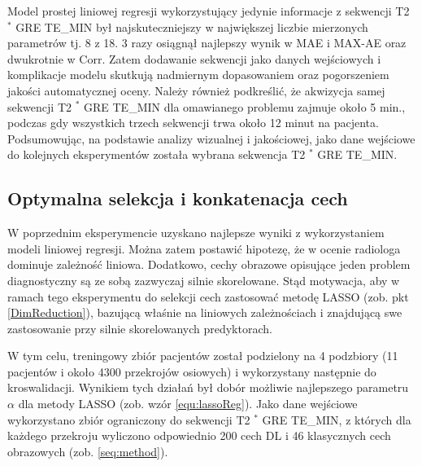 Model prostej liniowej regresji wykorzystujący jedynie informacje z sekwencji T2 $^\ast$ GRE TE\_MIN był najskuteczniejszy w największej liczbie mierzonych parametrów tj. 8 z 18. 3 razy osiągnął najlepszy wynik w MAE i MAX-AE oraz dwukrotnie w Corr. Zatem dodawanie sekwencji jako danych wejściowych i komplikacje modelu skutkują nadmiernym dopasowaniem oraz pogorszeniem jakości automatycznej oceny. Należy również podkreślić, że akwizycja samej sekwencji T2 $^\ast$ GRE TE\_MIN dla omawianego problemu zajmuje około 5 min., podczas gdy wszystkich trzech sekwencji trwa około 12 minut na pacjenta. Podsumowując, na podstawie analizy wizualnej i jakościowej, jako dane wejściowe do kolejnych eksperymentów została wybrana sekwencja T2 $^\ast$ GRE TE\_MIN. 

\subsection{Optymalna selekcja i konkatenacja cech}
\label{seq:fusion}
W poprzednim eksperymencie uzyskano najlepsze wyniki z wykorzystaniem modeli liniowej regresji. Można zatem postawić hipotezę, że w ocenie radiologa dominuje zależność liniowa. Dodatkowo, cechy obrazowe opisujące jeden problem diagnostyczny są ze sobą zazwyczaj silnie skorelowane. Stąd motywacja, aby w ramach tego eksperymentu do selekcji cech zastosować metodę LASSO (zob. pkt \ref{DimReduction}), bazującą właśnie na liniowych zależnościach i znajdującą swe zastosowanie przy silnie skorelowanych predyktorach.  

W tym celu, treningowy zbiór pacjentów został podzielony na 4 podzbiory (11 pacjentów i około 4300 przekrojów osiowych) i wykorzystany następnie do kroswalidacji. Wynikiem tych działań był dobór możliwie najlepszego parametru $\alpha$ dla metody LASSO (zob. wzór \ref{equ:lassoReg}). Jako dane wejściowe wykorzystano zbiór ograniczony do sekwencji T2 $^\ast$ GRE TE\_MIN, z których dla każdego przekroju wyliczono odpowiednio 200 cech DL i 46 klasycznych cech obrazowych (zob. \ref{seq:method}).

